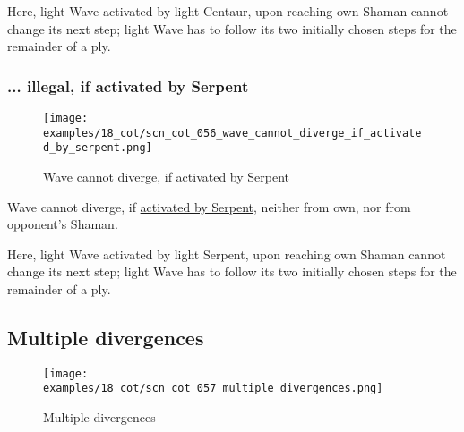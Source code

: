 Here, light Wave activated by light Centaur, upon reaching own Shaman cannot change
its next step; light Wave has to follow its two initially chosen steps for the
remainder of a ply.

\clearpage %

\subsubsection*{... illegal, if activated by Serpent}
\label{sec:Conquest of Tlalocan/Divergence/... illegal, if activated by Serpent}

\vspace*{-1.4\baselineskip}
\noindent
\begin{figure}[!h]
\texttt{[image: examples/18\_cot/scn\_cot\_056\_wave\_cannot\_diverge\_if\_activated\_by\_serpent.png]}
\vspace*{-1.3\baselineskip}
\caption{Wave cannot diverge, if activated by Serpent}
\label{fig:scn_cot_056_wave_cannot_diverge_if_activated_by_serpent}
\end{figure}

\vspace*{-0.5\baselineskip}
Wave cannot diverge, if
\hyperref[fig:scn_tr_31_serpent_activating_wave]{activated by Serpent},
neither from own, nor from opponent's Shaman.

Here, light Wave activated by light Serpent, upon reaching own Shaman cannot change
its next step; light Wave has to follow its two initially chosen steps for the
remainder of a ply.

\clearpage %

\subsection*{Multiple divergences}
\label{sec:Conquest of Tlalocan/Divergence/Multiple divergences}

\vspace*{-1.4\baselineskip}
\noindent
\begin{figure}[!h]
\texttt{[image: examples/18\_cot/scn\_cot\_057\_multiple\_divergences.png]}
\vspace*{-1.3\baselineskip}
\caption{Multiple divergences}
\label{fig:scn_cot_057_multiple_divergences}
\end{figure}

